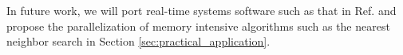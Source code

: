 \documentclass[conference,compsoc]{IEEEtran}
\newcommand{\comment}[1]{}
\begin{document}
In future work, we will port real-time systems software such as that in Ref. \cite{maruyama2016ros2} and propose the parallelization of memory intensive algorithms such as the nearest neighbor search in Section \ref{sec:practical_application}.

% 
% 

\renewcommand{\baselinestretch}{0.8}

\comment{2-5}
\comment{TBD: 3-6}
\vspace{-3mm}

\end{document}
